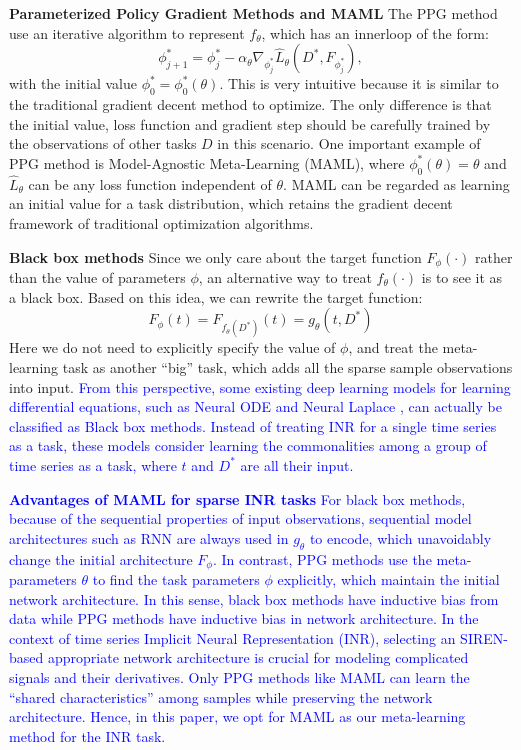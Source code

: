 \documentclass{article}
\begin{document}
\textbf{Parameterized Policy Gradient Methods and MAML}
The PPG method use an iterative algorithm to represent $f_\theta$, which has an innerloop of the form:
$$
\phi^*_{j+1}=\phi_j^*-\alpha_\theta \nabla_{\phi_j^*} \hat{L}_\theta\left(D^*, F_{\phi_j^*}\right),
$$
with the initial value $\phi_0^*=\phi_0^*(\theta)$.
This is very intuitive because it is similar to the traditional gradient decent method to optimize. 
The only difference is that the initial value, loss function and gradient step should be carefully trained by the observations of other tasks $D$ in this scenario.
One important example of PPG method is  Model-Agnostic Meta-Learning (MAML), where $\phi_0^*(\theta)=\theta$ and $\hat{L}_\theta$ can be any loss function independent of $\theta$.
MAML can be regarded as learning an initial value for a task distribution, which retains the gradient decent framework of traditional optimization algorithms.

\textbf{Black box methods}
Since we only care about the target function $F_\phi(\cdot)$ rather than the value of parameters $\phi$, an alternative way to treat $f_\theta(\cdot)$ is to see it as a black box. Based on this idea, we can rewrite the target function:
$$
F_\phi(t)=F_{f_\theta(D^*)}(t)=g_\theta(t,D^*)
$$
Here we do not need to explicitly specify the value of $\phi$, and treat the meta-learning task as another ``big'' task, which adds all the sparse sample observations into input.
\textcolor{blue}{
  From this perspective, some existing deep learning models for learning differential equations, 
  such as Neural ODE \cite{chen2018neural} and Neural Laplace \cite{holt2022neural}, 
  can actually be classified as Black box methods. 
  Instead of treating INR for a single time series as a task, 
  these models consider learning the commonalities among a group of time series as a task, where $t$ and $D^*$ are all their input.
}

\textcolor{blue}{
\textbf{Advantages of MAML for sparse INR tasks}
For black box methods, because of the sequential properties of input observations, sequential model architectures such as RNN are always used in $g_\theta$ to encode, which unavoidably change the initial architecture $F_\phi$.
In contrast, PPG methods use the meta-parameters $\theta$ to find the task parameters $\phi$ explicitly, which maintain the initial network architecture.
In this sense, black box methods have inductive bias from data while PPG methods have inductive bias in network architecture.
In the context of time series Implicit Neural Representation (INR), selecting an SIREN-based appropriate network architecture is crucial for modeling complicated signals and their derivatives.
Only PPG methods like MAML can learn the ``shared characteristics'' among samples while preserving the network architecture.
Hence, in this paper, we opt for MAML as our meta-learning method for the INR task.
}
\end{document}
